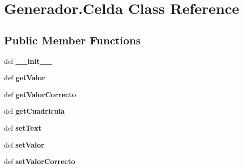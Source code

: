 \hypertarget{class_generador_1_1_celda}{\section{Generador.\-Celda Class Reference}
\label{class_generador_1_1_celda}
}
\subsection*{Public Member Functions}
\begin{DoxyCompactItemize}
\item 
\hypertarget{class_generador_1_1_celda_a99ba14581c4f92d9402fadd2df1259ef}{def {\bfseries \-\_\-\-\_\-init\-\_\-\-\_\-}}\label{class_generador_1_1_celda_a99ba14581c4f92d9402fadd2df1259ef}

\item 
\hypertarget{class_generador_1_1_celda_a00598ee2bc359706b3255aef3a3e6b95}{def {\bfseries get\-Valor}}\label{class_generador_1_1_celda_a00598ee2bc359706b3255aef3a3e6b95}

\item 
\hypertarget{class_generador_1_1_celda_a42ff22e50d1bd29e5b40bf4472ba655b}{def {\bfseries get\-Valor\-Correcto}}\label{class_generador_1_1_celda_a42ff22e50d1bd29e5b40bf4472ba655b}

\item 
\hypertarget{class_generador_1_1_celda_aa4450e9534af1616749a7ba0f4cd79c0}{def {\bfseries get\-Cuadricula}}\label{class_generador_1_1_celda_aa4450e9534af1616749a7ba0f4cd79c0}

\item 
\hypertarget{class_generador_1_1_celda_a767d397f9c7c4b24d2fc47faff43d3bc}{def {\bfseries set\-Text}}\label{class_generador_1_1_celda_a767d397f9c7c4b24d2fc47faff43d3bc}

\item 
\hypertarget{class_generador_1_1_celda_ab76b2b964a6ab2735fb9e0d0ba339a22}{def {\bfseries set\-Valor}}\label{class_generador_1_1_celda_ab76b2b964a6ab2735fb9e0d0ba339a22}

\item 
\hypertarget{class_generador_1_1_celda_ab3309853db0d2ce4f8c41236688e66b7}{def {\bfseries set\-Valor\-Correcto}}\label{class_generador_1_1_celda_ab3309853db0d2ce4f8c41236688e66b7}

\end{DoxyCompactItemize}
